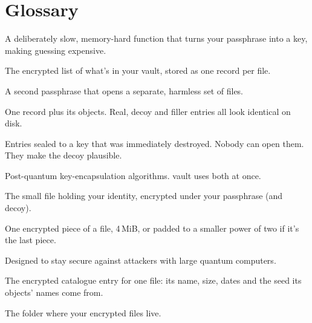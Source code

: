 \documentclass[10pt,oneside,openany]{book}
\begin{document}
\appendix
\vappendixtrue

\chapter{Glossary}

\begin{description}[style=nextline,leftmargin=0pt,font=\displaybold\color{vink},itemsep=4pt]
  \item[Argon2id] A deliberately slow, memory-hard function that turns your passphrase into a key, making guessing expensive.
  \item[Catalogue] The encrypted list of what's in your vault, stored as one record per file.
  \item[Decoy passphrase] A second passphrase that opens a separate, harmless set of files.
  \item[Entry] One record plus its objects. Real, decoy and filler entries all look identical on disk.
  \item[Filler] Entries sealed to a key that was immediately destroyed. Nobody can open them. They make the decoy plausible.
  \item[FrodoKEM, ML-KEM] Post-quantum key-encapsulation algorithms. vault uses both at once.
  \item[Key file] The small file holding your identity, encrypted under your passphrase (and decoy).
  \item[Object] One encrypted piece of a file, 4\,MiB, or padded to a smaller power of two if it's the last piece.
  \item[Post-quantum] Designed to stay secure against attackers with large quantum computers.
  \item[Record] The encrypted catalogue entry for one file: its name, size, dates and the seed its objects' names come from.
  \item[Vault] The folder where your encrypted files live.
\end{description}

\backmatter
\clearpage
\thispagestyle{empty}
\end{document}
